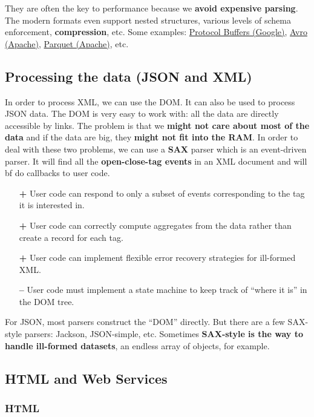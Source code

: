 They are often the key to performance because we {\bf avoid expensive parsing}. The modern formats even support nested structures, various levels of schema enforcement, {\bf compression}, etc. Some examples: \href{https://developers.google.com/protocol-buffers/docs/overview}{Protocol Buffers (Google)}, \href{https://avro.apache.org/docs/current/}{Avro (Apache)}, \href{https://parquet.apache.org/documentation/latest/}{Parquet (Apache)}, etc.

\subsection{Processing the data (JSON and XML)}

In order to process XML, we can use the DOM. It can also be used to process JSON data. The DOM is very easy to work with: all the data are directly accessible by links. The problem is that we {\bf might not care about most of the data} and if the data are big, they {\bf might not fit into the RAM}. In order to deal with these two problems, we can use a {\bf SAX} parser which is an event-driven parser. It will find all the {\bf open-close-tag events} in an XML document and will {bf do callbacks to user code}.

\begin{itemize}
 \item[{\bf +}] User code can respond to only a subset of events corresponding to the tag it is interested in.
 \item[{\bf +}] User code can correctly compute aggregates from the data rather than create a record for each tag.
 \item[{\bf +}] User code can implement flexible error recovery strategies for ill-formed XML.
 \item[{\bf --}] User code must implement a state machine to keep track of ``where it is'' in the DOM tree.
\end{itemize}

For JSON, most parsers construct the ``DOM'' directly. But there are a few SAX-style parsers: Jackson, JSON-simple, etc. Sometimes {\bf SAX-style is the way to handle ill-formed datasets}, an endless array of objects, for example.

\subsection{HTML and Web Services}

\subsubsection{HTML}

